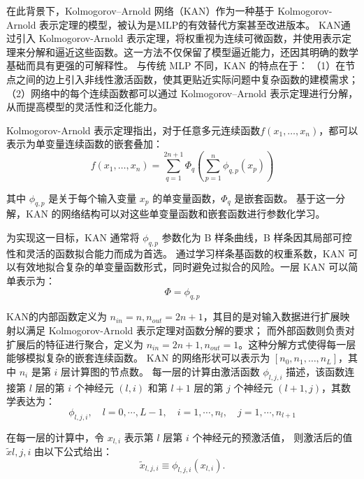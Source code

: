 在此背景下，Kolmogorov–Arnold 网络（KAN）\cite{kan}作为一种基于 Kolmogorov-Arnold 表示定理\cite{kan_theorem}的模型，被认为是MLP的有效替代方案甚至改进版本。
KAN通过引入 Kolmogorov-Arnold 表示定理，将权重视为连续可微函数，并使用表示定理来分解和逼近这些函数。这一方法不仅保留了模型逼近能力，还因其明确的数学基础而具有更强的可解释性。
与传统 MLP 不同，KAN 的特点在于：
（1）在节点之间的边上引入非线性激活函数，使其更贴近实际问题中复杂函数的建模需求；
（2）网络中的每个连续函数都可以通过 Kolmogorov–Arnold 表示定理进行分解，从而提高模型的灵活性和泛化能力。


Kolmogorov-Arnold 表示定理指出，对于任意多元连续函数$f(x_1, \ldots, x_n)$，都可以表示为单变量连续函数的嵌套叠加：
\begin{equation}
f(x_1, \ldots, x_n)=\sum_{q=1}^{2 n+1} \Phi_q(\sum_{p=1}^n \phi_{q, p}(x_p))
\end{equation}

其中 $\phi_{q, p}$ 是关于每个输入变量 $x_p$ 的单变量函数，$\Phi_q$ 是嵌套函数。
基于这一分解，KAN 的网络结构可以对这些单变量函数和嵌套函数进行参数化学习。

为实现这一目标，KAN 通常将 $\phi_{q, p}$ 参数化为 B 样条曲线，B 样条因其局部可控性和灵活的函数拟合能力而成为首选。
通过学习样条基函数的权重系数，KAN 可以有效地拟合复杂的单变量函数形式，同时避免过拟合的风险。一层 KAN 可以简单表示为：
\begin{equation}
    \Phi = {\phi_{q,p}}
\end{equation}

KAN的内部函数定义为 $n_{in}=n, n_{out}=2n+1$，其目的是对输入数据进行扩展映射以满足 Kolmogorov-Arnold 表示定理对函数分解的要求；
而外部函数则负责对扩展后的特征进行聚合，定义为 $n_{in}=2n+1, n_{out}=1$。这种分解方式使得每一层能够模拟复杂的嵌套连续函数。
KAN 的网络形状可以表示为 $[n_0, n_1, …, n_L]$，其中 $n_i$ 是第 $i$ 层计算图的节点数。
每一层的计算由激活函数 $\phi_{l,j,i}$ 描述，该函数连接第 $l$ 层的第 $i$ 个神经元 $(l,i)$ 和第 $l+1$ 层的第 $j$ 个神经元 $(l+1,j)$，其数学表达为：
\begin{equation}
    \phi_{l, j, i}, \quad l=0, \cdots, L-1, \quad i=1, \cdots, n_l, \quad j=1, \cdots, n_{l+1}
\end{equation}

在每一层的计算中，令 $x_{l,i}$ 表示第 $l$ 层第 $i$ 个神经元的预激活值，
则激活后的值 $\tilde{x}{l,j,i}$ 由以下公式给出：
\begin{equation}
    \tilde{x}_{l,j,i} \equiv \phi_{l,j,i}(x_{l,i}).
\end{equation}

